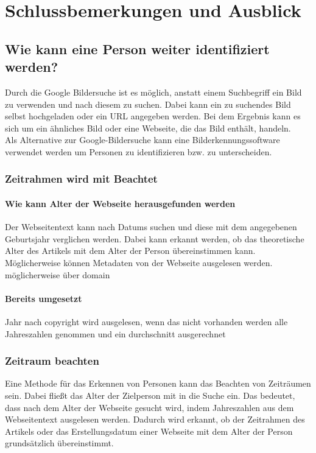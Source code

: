 \chapter{Schlussbemerkungen und Ausblick}
\label{chap:SchlussUndAusblick}
\section{Wie kann eine Person weiter identifiziert werden?}
Durch die Google Bildersuche ist es möglich, anstatt einem Suchbegriff ein Bild zu verwenden und nach diesem zu suchen. Dabei kann ein zu suchendes Bild selbst hochgeladen oder ein URL angegeben werden. Bei dem Ergebnis kann es sich um ein ähnliches Bild oder eine Webseite, die das Bild enthält, handeln.\\
Als Alternative zur Google-Bildersuche kann eine Bilderkennungssoftware verwendet werden um Personen zu identifizieren bzw. zu unterscheiden. %

	\subsection{Zeitrahmen wird mit Beachtet}
		\subsubsection{Wie kann Alter der Webseite herausgefunden werden}
		Der Webseitentext kann nach Datums suchen und diese mit dem angegebenen Geburtsjahr verglichen werden. Dabei kann erkannt werden, ob das theoretische Alter des Artikels mit dem Alter der Person übereinstimmen kann. Möglicherweise können Metadaten von der Webseite ausgelesen werden.
		möglicherweise über domain
		
		\subsubsection{Bereits umgesetzt}
		Jahr nach copyright wird ausgelesen, wenn das nicht vorhanden werden alle Jahreszahlen genommen und ein durchschnitt ausgerechnet
	
	\subsection{Zeitraum beachten}
	Eine Methode für das Erkennen von Personen kann das Beachten von Zeiträumen sein. Dabei fließt das Alter der Zielperson mit in die Suche ein. Das bedeutet, dass nach dem Alter der Webseite gesucht wird, indem Jahreszahlen aus dem Webseitentext ausgelesen werden. Dadurch wird erkannt, ob der Zeitrahmen des Artikels oder das Erstellungsdatum einer Webseite mit dem Alter der Person grundsätzlich übereinstimmt.
